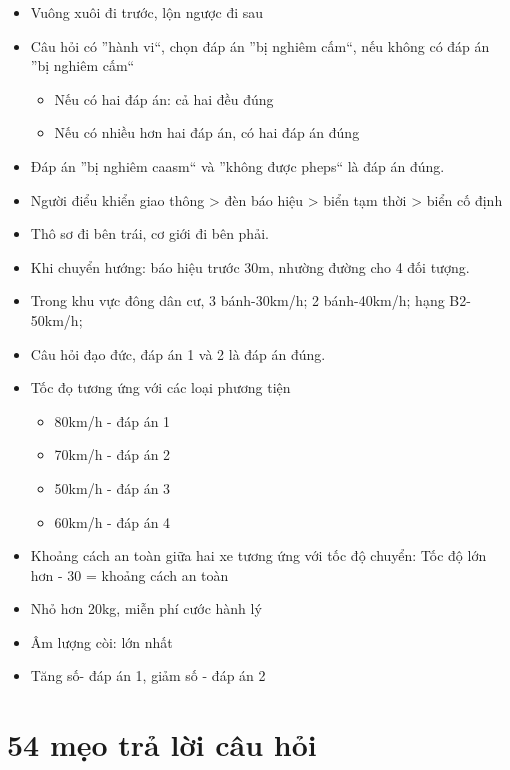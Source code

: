 \documentclass{article}
\begin{document}
\begin{itemize}
\item Vuông xuôi đi trước, lộn ngược đi sau
\item Câu hỏi có ''hành vi``, chọn đáp án ''bị nghiêm cấm``, nếu không có đáp án ''bị nghiêm cấm``
\begin{itemize}
\item Nếu có hai đáp án: cả hai đều đúng
\item Nếu có nhiều hơn hai đáp án, có hai đáp án đúng
\end{itemize}
\item Đáp án ''bị nghiêm caasm`` và ''không được pheps`` là đáp án đúng.
\item Người điểu khiển giao thông > đèn báo hiệu > biển tạm thời > biển cố định
\item Thô sơ đi bên trái, cơ giới đi bên phải.
\item Khi chuyển hướng: báo hiệu trước 30m, nhường đường cho 4 đối tượng.
\item Trong khu vực đông dân cư, 3 bánh-30km/h; 2 bánh-40km/h; hạng B2-50km/h; 
\item Câu hỏi đạo đức, đáp án 1 và 2 là đáp án đúng.
\item Tốc đọ tương ứng với các loại phương tiện
\begin{itemize}
\item 80km/h - đáp án 1
\item 70km/h - đáp án 2
\item 50km/h - đáp án 3
\item 60km/h - đáp án 4
\end{itemize}
\item Khoảng cách an toàn giữa hai xe tương ứng với tốc độ  chuyển: Tốc độ lớn hơn - 30 = khoảng cách an toàn
\item Nhỏ hơn 20kg, miễn phí cước hành lý
\item Âm lượng còi: lớn nhất
\item Tăng số- đáp án 1, giảm số - đáp án 2
\end{itemize}

\section{54 mẹo trả lời câu hỏi}
\end{document}
